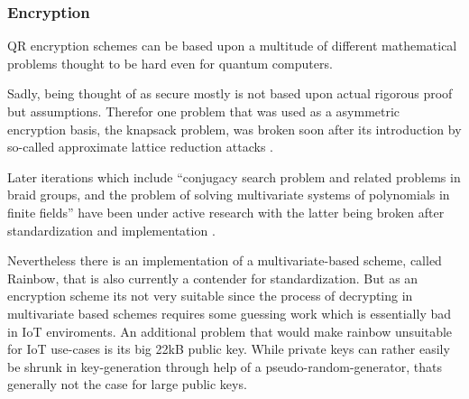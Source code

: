 \documentclass[conference]{IEEEtran}
\newcommand{\comment}[1]{}
\begin{document}
\subsubsection{Encryption}
\comment{ %
    knapsack problem - broken
    ''
    conjugacy search problem and related problems in braid groups, and the problem of solving
    multivariate systems of polynomials in finite fields
    '' also mostly broken or badly understood \cite{QR_algs}

    lattice based:
    - NTRUEncrypt (compare sigs)
    code based:
    - McEliece Error correction codes transformed - secure and fast (100micros) but keys are k*n matrices : millions of bits \cite{QR_algs} - not feasable 
    multivariate-based: decryption inefficent (''guess work'') \cite{QR_comparison}
    - Rainbow gigantic 22kbyte pubk
    Supersingular EC:
    not much in use and not super researched , one impl (SIKE) \cite{QR_comparison}
    Mixed schemes for backwards comp: neither fully safe nor efficent since 2 schemes need to be saved on device \cite{QR_comparison}

mostly code/lattice based implementations \cite{QR_comparison}
} %
QR encryption schemes can be based upon a multitude of different mathematical problems thought to be hard even for quantum computers.

Sadly, being thought of as secure mostly is not based upon actual rigorous proof but assumptions.
Therefor one problem that was used as a asymmetric encryption basis, the knapsack problem, was broken soon after its introduction by so-called approximate lattice reduction attacks \cite{QR_algs}.

Later iterations which include ``conjugacy search problem and related problems in braid groups, and the problem of solving
multivariate systems of polynomials in finite fields''\cite{QR_algs} have been under active research with the latter being broken after standardization and implementation \cite{QR_algs}.

Nevertheless there is an implementation of a multivariate-based scheme, called Rainbow, that is also currently a contender for standardization. But as an encryption scheme its not very suitable since the process of decrypting in multivariate based schemes requires some guessing work \cite{QR_comparison} which is essentially bad in IoT enviroments.
An additional problem that would make rainbow unsuitable for IoT use-cases is its big 22kB public key. While private keys can rather easily be shrunk in key-generation through help of a pseudo-random-generator, thats generally not the case for large public keys.
\end{document}

